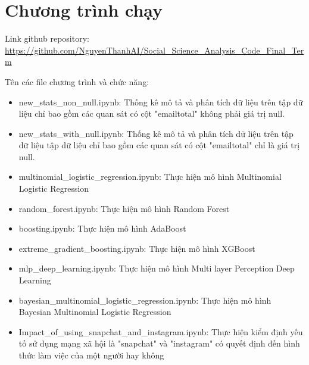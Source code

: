 \documentclass[14pt, a4paper]{article}
\numberwithin{equation}{section}
\numberwithin{figure}{section}
\theoremstyle{sltheorem}
\theoremstyle{soltheorem}
\begin{document}


\newpage
\section{Chương trình chạy}

Link github repository: \url{https://github.com/NguyenThanhAI/Social_Science_Analysis_Code_Final_Term}

Tên các file chương trình và chức năng:

\begin{itemize}
    \item new\_stats\_non\_null.ipynb: Thống kê mô tả và phân tích dữ liệu trên tập dữ liệu chỉ bao gồm các quan sát có cột "emailtotal" không phải giá trị null.
    \item new\_stats\_with\_null.ipynb: Thống kê mô tả và phân tích dữ liệu trên tập dữ liệu tập dữ liệu chỉ bao gồm các quan sát có cột "emailtotal" chỉ là giá trị null.
    \item multinomial\_logistic\_regression.ipynb: Thực hiện mô hình Multinomial Logistic Regression
    \item random\_forest.ipynb: Thực hiện mô hình Random Forest
    \item boosting.ipynb: Thực hiện mô hình AdaBoost 
    \item extreme\_gradient\_boosting.ipynb: Thực hiện mô hình XGBoost
    \item mlp\_deep\_learning.ipynb: Thực hiện mô hình Multi layer Perception Deep Learning
    \item bayesian\_multinomial\_logistic\_regression.ipynb: Thực hiện mô hình Bayesian Multinomial Logistic Regression
    \item Impact\_of\_using\_snapchat\_and\_instagram.ipynb: Thực hiện kiểm định yếu tố sử dụng mạng xã hội là "snapchat" và "instagram" có quyết định đến hình thức làm việc của một người hay không
\end{itemize}
\end{document}
